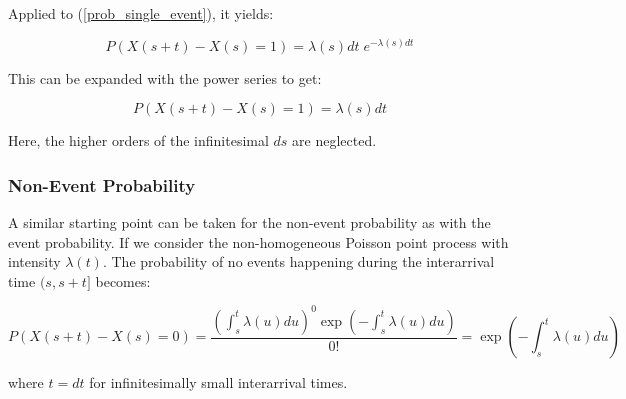 Applied to (\ref{prob_single_event}), it yields:

\begin{equation}
    P(X(s+t) - X(s) = 1) = \lambda(s)dt \; e^{-\lambda(s)dt}
\end{equation}

This can be expanded with the power series to get:

\begin{equation}
    P(X(s+t) - X(s) = 1) = \lambda(s) dt
\end{equation}

Here, the higher orders of the infinitesimal $ds$ are neglected.


\subsubsection{Non-Event Probability}
\label{sec:Method:Poisson:NonEventProbability}

A similar starting point can be taken for the non-event probability as with the event probability.
If we consider the non-homogeneous Poisson point process with intensity $\lambda(t)$. 
The probability of no events happening during the interarrival time $(s, s+t]$ becomes:

\begin{equation}
    P(X(s+t) - X(s) = 0) 
    = 
    \frac{\left(\int_s^t \lambda(u)du \right)^0 \exp \left(- \int_s^t \lambda(u)du\right)}{0!}
    = 
    \exp \left(- \int_s^t \lambda(u)du\right)
\end{equation}

where $t = dt$ for infinitesimally small interarrival times.
